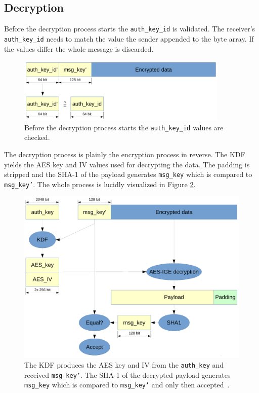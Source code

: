 \documentclass[thesis=M,english]{FITthesis}[2012/10/20]
\begin{document}
\subsection{Decryption}\label{crypto-regular-dec}

Before the decryption process starts the \texttt{auth\_key\_id} is validated. The receiver's \texttt{auth\_key\_id} needs to match the value the sender appended to the byte array. If the values differ the whole message is discarded.

\begin{figure}[htb]
	\centering
	\includegraphics[width=0.9\textwidth]{mtproto-auth-key.pdf}
	\caption[Message acceptance check]{Before the decryption process starts the \texttt{auth\_key\_id} values are checked.}
	\label{img:crypto-regular-dec}
\end{figure}

The decryption process is plainly the encryption process in reverse. The KDF yields the AES key and IV values used for decrypting the data. The padding is stripped and the SHA-1 of the payload generates \texttt{msg\_key} which is compared to \texttt{msg\_key'}. The whole process is lucidly visualized in Figure \ref{img:telegram-decflow}.

\begin{figure}[htb]
	\centering
	\includegraphics[width=1\textwidth]{mtproto-decflow.pdf}
	\caption[MTProto decryption flow]{The KDF produces the AES key and IV from the \texttt{auth\_key} and received \texttt{msg\_key'}. The SHA-1 of the decrypted payload generates \texttt{msg\_key} which is compared to \texttt{msg\_key'} and only then accepted~\cite{telegram-aarhus}.}
	\label{img:telegram-decflow}
\end{figure}
\end{document}
